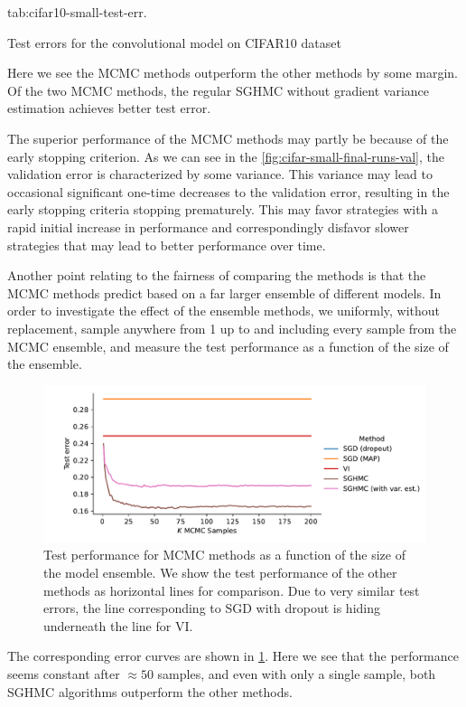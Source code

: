 {tab:cifar10-small-test-err}. 
\begin{table}[htbp]
    \centering
    
    \caption{Test errors for the convolutional model on CIFAR10 dataset}
    \label{tab:cifar10-small-test-err}
\end{table}
Here we see the MCMC methods outperform the other methods by some margin.
Of the two MCMC methods, the regular SGHMC without gradient variance estimation achieves better test error. 

The superior performance of the MCMC methods may partly be because of the early stopping criterion.
As we can see in the \cref{fig:cifar-small-final-runs-val}, the validation error is characterized by some variance.
This variance may lead to occasional significant one-time decreases to the validation error, resulting in the early stopping criteria stopping prematurely.
This may favor strategies with a rapid initial increase in performance and correspondingly disfavor slower strategies that may lead to better performance over time.

Another point relating to the fairness of comparing the methods is that the MCMC methods predict based on a far larger ensemble of different models.
In order to investigate the effect of the ensemble methods, we uniformly, without replacement, sample anywhere from 1 up to and including every sample from the MCMC ensemble, and measure the test performance as a function of the size of the ensemble. 
\begin{figure}[htbp]
    \centering
    \includegraphics[width=\linewidth]{Figures/cifar-small-downsampling.pdf}
    \caption{Test performance for MCMC methods as a function of the size of the model ensemble.
    We show the test performance of the other methods as horizontal lines for comparison.
    Due to very similar test errors, the line corresponding to SGD with dropout is hiding underneath the line for VI.}
    \label{fig:cifar-small-downsampling}
\end{figure}
The corresponding error curves are shown in \cref{fig:cifar-small-downsampling}.
Here we see that the performance seems constant after $\approx 50$ samples, and even with only a single sample, both SGHMC algorithms outperform the other methods.

